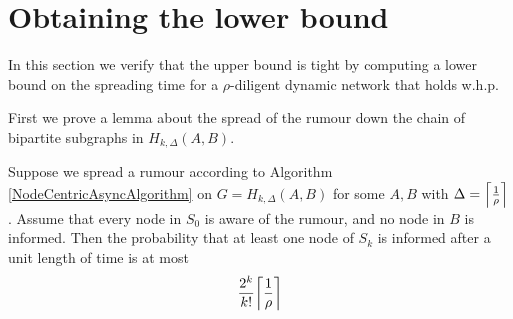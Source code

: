 \section{Obtaining the lower bound}\label{section:adversarialLowerBound}

In this section we verify that the upper bound is tight by computing a lower bound on the spreading time for a $\rho$-diligent dynamic network that holds w.h.p.

First we prove a lemma about the spread of the rumour down the chain of bipartite subgraphs in $H_{k, \Delta}(A,B)$.

\begin{lemma}\label{lemma:H_k,DeltaABOneStep}
	Suppose we spread a rumour according to Algorithm \ref{NodeCentricAsyncAlgorithm} on $G = H_{k, \Delta}(A,B)$ for some $A, B$ with $\Delta = \ceil*{\frac{1}{\rho}}$. Assume that every node in $S_0$ is aware of the rumour, and no node in $B$ is informed. Then the probability that at least one node of $S_k$ is informed after a unit length of time is at most
	$$
		\frac{2^k}{k!}\ceil*{\frac{1}{\rho}}
	$$	
\end{lemma}

